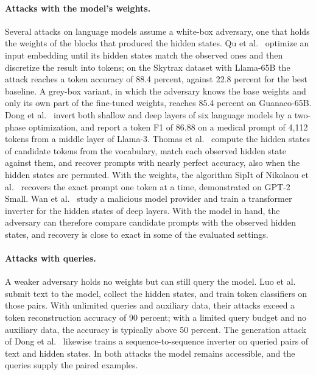 \paragraph{Attacks with the model's weights.} Several attacks on language models assume a white-box adversary, one that holds the weights of the blocks that produced the hidden states.
Qu et al.~\cite{qu2025prompt} optimize an input embedding until its hidden states match the observed ones and then discretize the result into tokens; on the Skytrax dataset with Llama-65B the attack reaches a token accuracy of 88.4 percent, against 22.8 percent for the best baseline.
A grey-box variant, in which the adversary knows the base weights and only its own part of the fine-tuned weights, reaches 85.4 percent on Guanaco-65B.
Dong et al.~\cite{dong2025depth} invert both shallow and deep layers of six language models by a two-phase optimization, and report a token F1 of 86.88 on a medical prompt of 4,112 tokens from a middle layer of Llama-3.
Thomas et al.~\cite{thomas2025hidden} compute the hidden states of candidate tokens from the vocabulary, match each observed hidden state against them, and recover prompts with nearly perfect accuracy, also when the hidden states are permuted.
With the weights, the algorithm SipIt of Nikolaou et al.~\cite{nikolaou2026language} recovers the exact prompt one token at a time, demonstrated on GPT-2 Small.
Wan et al.~\cite{wan2024information} study a malicious model provider and train a transformer inverter for the hidden states of deep layers.
With the model in hand, the adversary can therefore compare candidate prompts with the observed hidden states, and recovery is close to exact in some of the evaluated settings.

\paragraph{Attacks with queries.} A weaker adversary holds no weights but can still query the model.
Luo et al.~\cite{luo2025prompt} submit text to the model, collect the hidden states, and train token classifiers on those pairs.
With unlimited queries and auxiliary data, their attacks exceed a token reconstruction accuracy of 90 percent; with a limited query budget and no auxiliary data, the accuracy is typically above 50 percent.
The generation attack of Dong et al.~\cite{dong2025depth} likewise trains a sequence-to-sequence inverter on queried pairs of text and hidden states.
In both attacks the model remains accessible, and the queries supply the paired examples.

